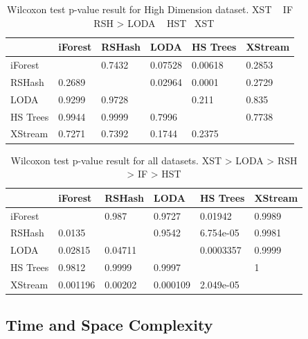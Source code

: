 \begin{table}
\centering
    \begin{tabular}{|l|lllll|}
    \hline
    ~        & iForest   & RSHash    & LODA      & HS Trees  & XStream \\	\hline
    iForest  & ~         & 0.7432    & 0.07528    & 0.00618    & 0.2853       \\ 
    RSHash   & 0.2689    & ~         &  0.02964   & 0.0001    & 0.2729       \\
    LODA     & 0.9299   & 0.9728   & ~         & 0.211   & 0.835      \\
    HS Trees & 0.9944    & 0.9999    & 0.7996     & ~         & 0.7738       \\
    XStream  & 0.7271 & 0.7392 & 0.1744 & 0.2375 & ~       \\	\hline
    \end{tabular}
    \caption{Wilcoxon test p-value result for High Dimension dataset. XST ~ IF ~ RSH >  LODA ~ HST ~XST}
\end{table}

\begin{table}
\centering
    \begin{tabular}{|l|lllll|}
    \hline
    ~        & iForest   & RSHash    & LODA      & HS Trees  & XStream \\	\hline
    iForest  & ~         & 0.987    & 0.9727    & 0.01942    & 0.9989       \\ 
    RSHash   & 0.0135    & ~         &  0.9542   & 6.754e-05    & 0.9981       \\
    LODA     & 0.02815   & 0.04711   & ~         & 0.0003357   & 0.9999      \\
    HS Trees & 0.9812    & 0.9999    & 0.9997     & ~         & 1       \\
    XStream  & 0.001196 & 0.00202 & 0.000109 & 2.049e-05 & ~       \\	\hline
    \end{tabular}
    \caption{Wilcoxon test p-value result for all datasets. XST > LODA > RSH > IF > HST}
\end{table}


\subsection{Time and Space Complexity}
%
%


